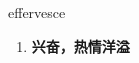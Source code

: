 
\begin{frame}
{\huge effervesce}
\begin{center}
\begin{enumerate}\Large
  \item \textbf{兴奋，热情洋溢}
\end{enumerate}
\end{center}
\end{frame}
